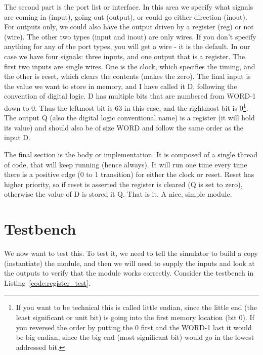 The second part is the port list or interface.  In this area we specify what signals are coming in (input), going out (output), or could go either direction (inout).  For outputs only, we could also have the output driven by a register (reg) or not (wire).  The other two types (input and inout) are only wires.  If you don't specify anything for any of the port types, you will get a wire - it is the default.  In our case we have four signals: three inputs, and one output that is a register.  The first two inputs are single wires.  One is the clock, which specifies the timing, and the other is reset, which clears the contents (makes the zero).  The final input is the value we want to store in memory, and I have called it D, following the convention of digital logic.  D has multiple bits that are numbered from WORD-1 down to 0.  Thus the leftmost bit is 63 in this case, and the rightmost bit is 0\footnote{If you want to be technical this is called little endian, since the little end (the least significant or unit bit) is going into the first memory location (bit 0).  If you reversed the order by putting the 0 first and the WORD-1 last it would be big endian, since the big end (most significant bit) would go in the lowest addressed bit.}.  The output Q (also the digital logic conventional name) is a register (it will hold its value) and should also be of size WORD and follow the same order as the input D.

The final section is the body or implementation.  It is composed of a single thread of code, that will keep running (hence always).  It will run one time every time there is a positive edge (0 to 1 transition) for either the clock or reset.  Reset has higher priority, so if reset is asserted the register is cleared (Q is set to zero), otherwise the value of D is stored it Q.  That is it.  A nice, simple module.

\section{Testbench}

We now want to test this.  To test it, we need to tell the simulator to build a copy (instantiate) the module, and then we will need to supply the inputs and look at the outputs to verify that the module works correctly.  Consider the testbench in Listing~\ref{code:register_test}.


